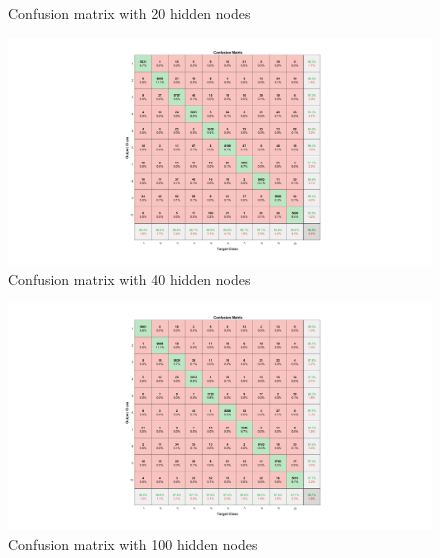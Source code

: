\documentclass{article}
\begin{document}
{{\begin{figure}[H]
            \caption{Confusion matrix with 20 hidden nodes}
        \end{figure}
        \begin{figure}[H]
            \centering
            \includegraphics[width = 1.0\linewidth]{src1/Confusion_40.png}
            \caption{Confusion matrix with 40 hidden nodes}
        \end{figure}
        \begin{figure}[H]
            \centering
            \includegraphics[width = 1.0\linewidth]{src1/Confusion_100.png}
            \caption{Confusion matrix with 100 hidden nodes}
        \end{figure}
    
        
    }

}
\end{document}
